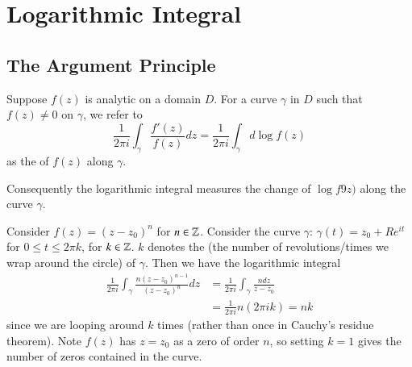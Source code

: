 %
%
%
\chapter{Logarithmic Integral}
\label{LogInt} %

\section{The Argument Principle}


\begin{definition}
    Suppose $f(z)$ is analytic on a domain $D$. For a curve $\gamma$ in $D$ such that $f(z) \neq 0$ on $\gamma$, we refer to \begin{equation*}
        \frac{1}{2\pi i}\int_{\gamma}\frac{f'(z)}{f(z)}dz = \frac{1}{2\pi i}\int_{\gamma}d\log f(z)
    \end{equation*}
    as the  of $f(z)$ along $\gamma$.
\end{definition}

Consequently the logarithmic integral measures the change of $\log f9z)$ along the curve $\gamma$.

\begin{example}
    Consider $f(z) = (z-z_0)^n$ for $n \in \mathbb Z$. Consider the curve $\gamma$: $\gamma(t) = z_0+Re^{it}$ for $0 \leq t \leq 2\pi k$, for $k \in \mathbb Z$. $k$ denotes the  (the number of revolutions/times we wrap around the circle) of $\gamma$. Then we have the logarithmic integral \begin{align*}
        \frac{1}{2\pi i}\int_{\gamma}\frac{n(z-z_0)^{n-1}}{(z-z_0)^n}dz &= \frac{1}{2\pi i}\int_{\gamma}\frac{ndz}{z-z_0} \\
        &= \frac{1}{2\pi i}n(2\pi i k) = nk
    \end{align*}
    since we are looping around $k$ times (rather than once in Cauchy's residue theorem). Note $f(z)$ has $z=z_0$ as a zero of order $n$, so setting $k = 1$ gives the number of zeros contained in the curve.
\end{example}

